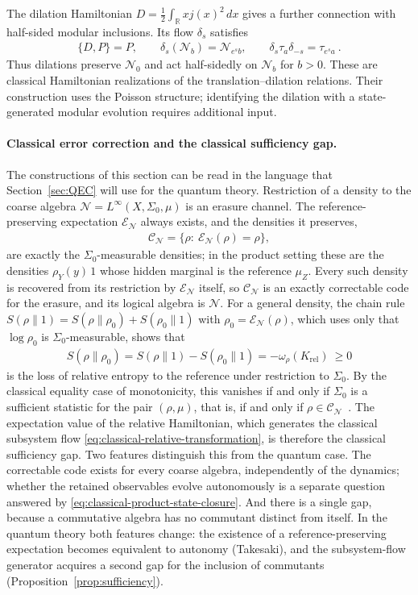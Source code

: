 \documentclass[a4paper,11pt]{article}
\theoremstyle{definition}
\newcommand{\mN}{\mathcal{N}}
\newcommand{\mE}{\mathcal{E}}
\begin{document}
The dilation Hamiltonian $D=\frac12\int_{\mathbb R}xj(x)^2\,dx$ gives a further connection with half-sided modular inclusions. Its flow $\delta_s$ satisfies
\begin{align}
    \{D,P\}=P,
    \qquad \delta_s(\mN_b)=\mN_{e^s b},
    \qquad \delta_s\tau_a\delta_{-s}=\tau_{e^s a}\ .
\end{align}
Thus dilations preserve $\mN_0$ and act half-sidedly on $\mN_b$ for $b>0$. These are classical Hamiltonian realizations of the translation--dilation relations. Their construction uses the Poisson structure; identifying the dilation with a state-generated modular evolution requires additional input.

\paragraph{Classical error correction and the classical sufficiency gap.}
The constructions of this section can be read in the language that Section~\ref{sec:QEC} will use for the quantum theory. Restriction of a density to the coarse algebra $\mN=L^\infty(X,\Sigma_0,\mu)$ is an erasure channel. The reference-preserving expectation $\mE_{\mN}$ always exists, and the densities it preserves,
\begin{align}
 \mathcal C_{\mN}=\{\rho:\ \mE_{\mN}(\rho)=\rho\},
\end{align}
are exactly the $\Sigma_0$-measurable densities; in the product setting these are the densities $\rho_Y(y)\,1$ whose hidden marginal is the reference $\mu_Z$. Every such density is recovered from its restriction by $\mE_{\mN}$ itself, so $\mathcal C_{\mN}$ is an exactly correctable code for the erasure, and its logical algebra is $\mN$. For a general density, the chain rule $S(\rho\|1)=S(\rho\|\rho_0)+S(\rho_0\|1)$ with $\rho_0=\mE_{\mN}(\rho)$, which uses only that $\log\rho_0$ is $\Sigma_0$-measurable, shows that
\begin{align}\label{eq:classical-sufficiency-gap}
 S(\rho\|\rho_0)=S(\rho\|1)-S(\rho_0\|1)=-\omega_\rho(K_{\mathrm{rel}})\ \ge0
\end{align}
is the loss of relative entropy to the reference under restriction to $\Sigma_0$. By the classical equality case of monotonicity, this vanishes if and only if $\Sigma_0$ is a sufficient statistic for the pair $(\rho,\mu)$, that is, if and only if $\rho\in\mathcal C_{\mN}$~\cite{OhyaPetz1993}. The expectation value of the relative Hamiltonian, which generates the classical subsystem flow \eqref{eq:classical-relative-transformation}, is therefore the classical sufficiency gap. Two features distinguish this from the quantum case. The correctable code exists for every coarse algebra, independently of the dynamics; whether the retained observables evolve autonomously is a separate question answered by \eqref{eq:classical-product-state-closure}. And there is a single gap, because a commutative algebra has no commutant distinct from itself. In the quantum theory both features change: the existence of a reference-preserving expectation becomes equivalent to autonomy (Takesaki), and the subsystem-flow generator acquires a second gap for the inclusion of commutants (Proposition~\ref{prop:sufficiency}).



\end{document}
